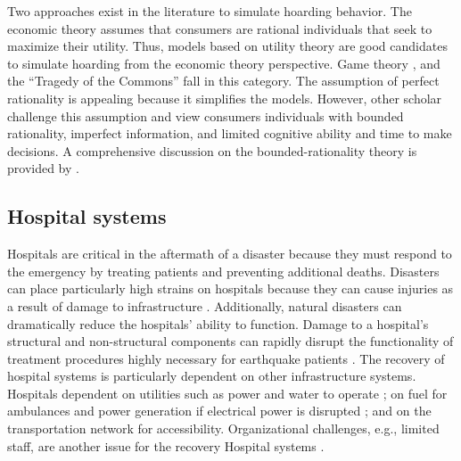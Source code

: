 Two approaches exist in the literature to simulate hoarding behavior. The economic theory assumes that consumers are rational individuals that seek to maximize their utility. Thus, models based on utility theory are good candidates to simulate hoarding from the economic theory perspective. Game theory \citep{hallsworth2000urban}, and the ``Tragedy of the Commons'' \citep{hardin2009tragedy} fall in this category. The assumption of perfect rationality is appealing because it simplifies the models. However, other scholar challenge this assumption and view consumers individuals with bounded rationality, imperfect information, and limited cognitive ability and time to make decisions. A comprehensive discussion on the bounded-rationality theory is provided by \cite{sep-bounded-rationality}. \

\subsection{Hospital systems}
Hospitals are critical in the aftermath of a disaster because they must respond to the emergency by treating patients and preventing additional deaths. Disasters can place particularly high strains on hospitals because they can cause injuries as a result of damage to infrastructure \citep{ceferino2018regional,ceferino2018probabilistic,johnston20142010,jun2010analysis}. Additionally, natural disasters can dramatically reduce the hospitals' ability to function. Damage to a hospital's structural and non-structural components can rapidly disrupt the functionality of treatment procedures highly necessary for earthquake patients \citep{bambaren2011a3,mitrani2012functional}. The recovery of hospital systems is particularly dependent on other infrastructure systems. Hospitals dependent on utilities such as power and water to operate \citep{Chand2015, jacques2014resilience, Achour2014, Hiete2011, McDaniels2008}; on fuel for ambulances and power generation if electrical power is disrupted \citep{Hiete2011}; and on the transportation network for accessibility. Organizational challenges, e.g., limited staff, are another issue for the recovery Hospital systems \citep{Cimellaro2016}. \


